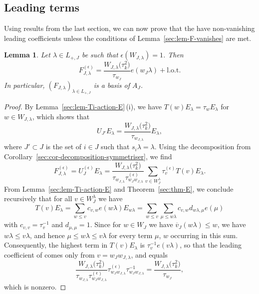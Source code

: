 \documentclass[pdftex]{sigma}
\newtheorem{Lemma}[Theorem]{Lemma}
\theoremstyle{definition}
\numberwithin{equation}{section}
\begin{document}
\subsection{Leading terms}
Using results from the last section, we can now prove that the
 have non-vanishing leading coefficients unless
the conditions of Lemma~\ref{sec:lem-F-vanishes} are met.

\begin{Lemma}\label{sec:lem-F-leading}
 Let $\lambda\in L_{+,J}$ be such that $\epsilon(W_{J,\lambda})=1$. Then
 \[
 F^{(\epsilon)}_{J,\lambda} = \frac{W_{J,\lambda}\bigl(\tau_k^2\bigr)}{\tau_{w_J}} e(w_J\lambda) + \text{l.o.t.}
 \]
 In particular, $(F_{J,\lambda})_{\lambda\in L_{+,J}}$ is a basis of $A_J$.
\end{Lemma}
\begin{proof}
 By Lemma~\ref{sec:lem-Ti-action-E}\,(i), we have
 $T(w)E_\lambda=\tau_w E_\lambda$ for $w\in W_{J,\lambda}$, which shows that
 \[
 U_{J'} E_\lambda = \frac{W_{J,\lambda}\bigl(\tau_k^2\bigr)}{\tau_{w_{J,\lambda}}}
 E_\lambda,
 \]
 where $J'\subset J$ is the set of $i\in J$ such that $s_i\lambda=\lambda$.
 Using the decomposition from Corollary~\ref{sec:cor-decomposition-symmetriser}, we find
 \[
 F^{(\epsilon)}_{J,\lambda}
 = U^{(\epsilon)}_J E_\lambda
 = \frac{W_{J,\lambda}\bigl(\tau_k^2\bigr)}{\tau_{w_{J,\lambda}} \tau^{(\epsilon)}_{w_Jw_{J,\lambda}}}
 \sum_{v\in W_J^\lambda} \tau^{(\epsilon)}_v T(v) E_\lambda.
 \]
 From Lemma~\ref{sec:lem-Ti-action-E} and Theorem~\ref{sec:thm-E}, we
 conclude recursively that for all $v\in W_J^\lambda$ we have
 \[
 T(v)E_\lambda = \sum_{w\le v} c_{v,w} e(w\lambda)E_{w\lambda}
 = \sum_{w\le v}\sum_{\mu\le w\lambda} c_{v,w} d_{w\lambda,\mu} e(\mu)
 \]
 with $c_{v,v}=\tau_v^{-1}$ and $d_{\mu,\mu}=1$. Since for $w\in W_J$ we have
 $\overline{v}_J(w\lambda)\le w$, we have $w\lambda\le v\lambda$,
 and hence $\mu\le w\lambda\le v\lambda$ for every term $\mu$, $w$ occurring
 in this sum. Consequently, the highest term in $T(v)E_\lambda$ is
 $\tau_v^{-1}e(v\lambda)$, so that the leading coefficient of  comes only from $v=w_Jw_{J,\lambda}$, and equals
 \[
 \frac{W_{J,\lambda}\bigl(\tau_k^2\bigr)}{\tau_{w_{J,\lambda}} \tau^{(\epsilon)}_{w_Jw_{J,\lambda}}}
 \tau^{(\epsilon)}_{w_Jw_{J,\lambda}} \tau_{w_J w_{J,\lambda}}^{-1}
 = \frac{W_{J,\lambda}\bigl(\tau_k^2\bigr)}{\tau_{w_J}},
 \]
 which is nonzero.


\end{proof}
\end{document}
